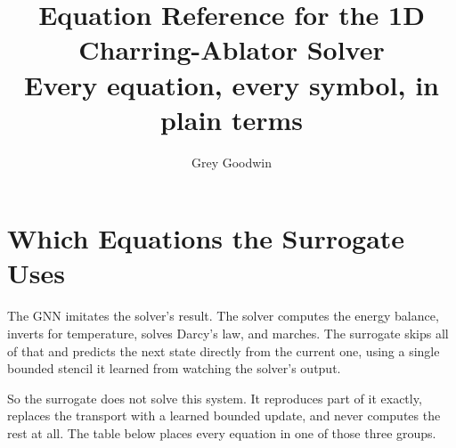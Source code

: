 \documentclass[11pt]{article}
\title{Equation Reference for the 1D Charring-Ablator Solver\\
\large Every equation, every symbol, in plain terms}
\author{Grey Goodwin}
\date{}
\begin{document}
\maketitle

\section{Which Equations the Surrogate Uses}

The GNN imitates the solver's result. The solver computes the energy balance,
inverts for temperature, solves Darcy's law, and marches. The surrogate skips all
of that and predicts the next state directly from the current one, using a single
bounded stencil it learned from watching the solver's output.

So the surrogate does not solve this system. It reproduces part of it exactly,
replaces the transport with a learned bounded update, and never computes the rest
at all. The table below places every equation in one of those three groups.
\end{document}
